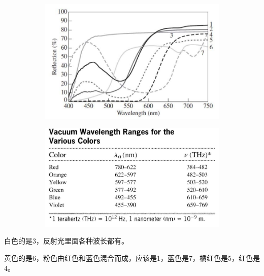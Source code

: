 \documentclass{article}
\begin{document}
\begin{figure}[H]
  \centering
  \begin{subfigure}{.5\textwidth}
    \centering
    \includegraphics[width=\linewidth]{figures/Spectrum1}
    \label{fig:}
  \end{subfigure}%
  \begin{subfigure}{.5\textwidth}
    \centering
    \includegraphics[width=\linewidth]{figures/Spectrum2}
    \label{fig:}
  \end{subfigure}
  \label{fig:}
\end{figure}

白色的是3，反射光里面各种波长都有。

黄色的是6，粉色由红色和蓝色混合而成，应该是1，蓝色是7，橘红色是5，红色是4。
\end{document}
